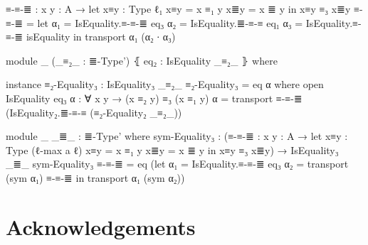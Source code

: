\documentclass{article}
\begin{document}
\begin{code}
        ≡-≡-≣ : {x y : A} → let
          x≡y : Type ℓ₁
          x≡y = x ≡₁ y
          x≣y = x ≣ y
          in x≡y ≡₃ x≣y
        ≡-≡-≣ = let
          α₁ = IsEquality.≡-≡-≣ eq₃
          α₂ = IsEquality.≣-≡-≡ eq₁
          α₃ = IsEquality.≡-≡-≣ isEquality
          in transport α₁ (α₂ ∙ α₃)

      module _
        (_≡₂_ : ≣-Type')
        ⦃ eq₂ : IsEquality _≡₂_ ⦄
        where

        instance
          ≡₂-Equality₃ : IsEquality₃ _≡₂_
          ≡₂-Equality₃ = eq α
            where
              open IsEquality eq₃
              α : ∀ {x y} → (x ≡₂ y) ≡₃ (x ≡₁ y)
              α = transport ≡-≡-≣ (IsEquality₂.≣-≡-≡ (≡₂-Equality₂ _≡₂_))

      module _ {_≣_ : ≣-Type'} where
        sym-Equality₃ : (≡-≡-≣ : {x y : A} → let
          x≡y : Type (ℓ-max a ℓ)
          x≡y = x ≡₁ y
          x≣y = x ≣ y
          in x≡y ≡₃ x≣y)
          → IsEquality₃ _≣_
        sym-Equality₃ ≡-≡-≣ = eq (let
          α₁ = IsEquality.≡-≡-≣ eq₃
          α₂ = transport (sym α₁) ≡-≡-≣
          in transport α₁ (sym α₂))
\end{code}

\section*{Acknowledgements}



\end{document}
